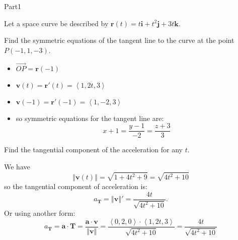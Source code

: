 \documentclass{report}
\newcommand{\norm}[1]{\left\Vert #1 \right\Vert}
\newcommand{\avec}[1]{\left\langle #1 \right\rangle}
\newcommand{\vect}[1]{\overrightarrow{#1}}
\begin{document}
\begin{exam}{Part1}
\begin{problem*}[\auto]Let a space curve be described by $\mathbf{r}(t)=t\mathbf{i}+t^2\mathbf{j}+3t\mathbf{k}$. 
\begin{parts}
\item{} Find the symmetric equations of the tangent line to the curve at the point $P(-1,1,-3)$.
\begin{solution}[1.75in]
\begin{itemize}
\item $\vect{OP}=\mathbf{r}(-1)$
\item $\mathbf{v}(t)=\mathbf{r'}(t)=\avec{1,2t,3}$
\item $\mathbf{v}(-1)=\mathbf{r'}(-1)=\avec{1,-2,3}$
\item so symmetric equations for the tangent line are:
$$\boxed{x+1=\frac{y-1}{-2}=\frac{z+3}{3}} $$
\end{itemize}
\end{solution}
\item{} Find the tangential component of the acceleration for any $t$.
\begin{solution}[1.75in] We have
$$\norm{\mathbf{v}(t)}=\sqrt{1+4t^2+9}=\sqrt{4t^2+10} $$
so the tangential component of acceleration is:
$$a_{\mathbf{T}}=\norm{\mathbf{v}}'=\boxed{\frac{4t}{\sqrt{4t^2+10}}}. $$
Or using another form:
$$a_{\mathbf{T}}=\mathbf{a}\cdot\mathbf{T}=\frac{\mathbf{a}\cdot\mathbf{v}}{\norm{\mathbf{v}}}=\frac{\avec{0,2,0}\cdot\avec{1,2t,3}}{\sqrt{4t^2+10}}=\boxed{\frac{4t}{\sqrt{4t^2+10}}} $$
\end{solution}
\end{parts}
\end{problem*}


\end{exam}
\end{document}

